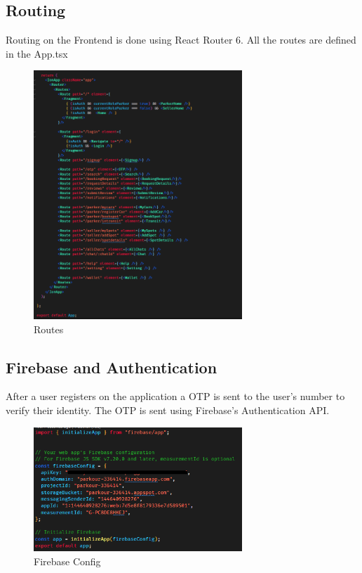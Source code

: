     \subsection{Routing}
    Routing on the Frontend is done using React Router 6. All the routes are defined in the App.tsx
    \begin{figure}[h]
        \centering
        \includegraphics[width=0.7\textwidth]{images/routes.png}
        \caption{Routes}
        \label{fig:routes}
    \end{figure}

    \pagebreak

    \subsection{Firebase and Authentication}
    After a user registers on the application a OTP is sent to the user's number to verify their identity. The OTP is sent using Firebase's Authentication API.

    \begin{figure}[h]
        \centering
        \includegraphics[width=0.7\textwidth]{images/firebaseConfig.png}
        \caption{Firebase Config}
        \label{fig:firebaseConfig}
    \end{figure}

